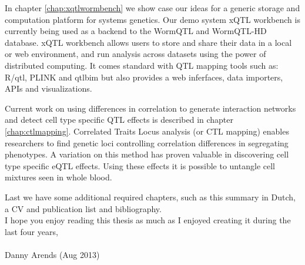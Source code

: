\documentclass[8pt, twoside]{book}
\begin{document}
In chapter \ref{chap:xqtlwormbench} we show case our ideas for a generic storage and 
computation platform for systems genetics. Our demo system xQTL workbench is currently 
being used as a backend to the WormQTL and WormQTL-HD database. xQTL workbench allows 
users to store and share their data in a local or web environment, and run analysis across 
datasets using the power of distributed computing. It comes standard with QTL mapping 
tools such as: R/qtl, PLINK and qtlbim but also provides a web inferfaces, data importers, 
APIs and visualizations.

Current work on using differences in correlation to generate interaction networks and detect 
cell type specific QTL effects is described in chapter \ref{chap:ctlmapping}. Correlated 
Traits Locus analysis (or CTL mapping) enables researchers to find genetic loci controlling 
correlation differences in segregating phenotypes. A variation on this method has proven 
valuable in discovering cell type specific eQTL effects. Using these effects it is possible 
to untangle cell mixtures seen in whole blood.


Last we have some additional required chapters, such as this summary in Dutch, a CV and publication 
list and bibliography.\\

I hope you enjoy reading this thesis as much as I enjoyed creating it during the last four years,\\\\

Danny Arends (Aug 2013)
\newpage
\thispagestyle{empty}


















{\footnotesize

}
\end{document}
